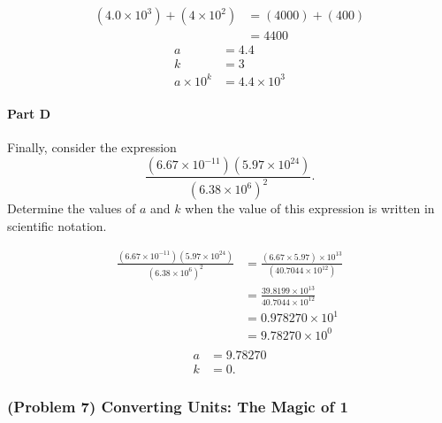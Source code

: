 \vspace{1em}

\begin{solution}
	\begin{align*}
		\left( 4.0 \times 10^{3} \right) + \left( 4 \times 10^2 \right) &=
		\left( 4000 \right) + \left( 400 \right) \\
		&= 4400
	\end{align*}
	\begin{align*}
		a &= 4.4 \\
		k &= 3 \\
		a \times 10^{k} &= 4.4 \times 10^{3}
	\end{align*}
\end{solution}

\paragraph{Part D}

Finally, consider the expression
\[
	\frac{\left( 6.67 \times 10^{-11} \right)\left( 5.97 \times 10^{24} \right)}{\left( 6.38 \times 10^{6} \right)^2}
	.\]
Determine the values of $a$ and $k$ when the value of this expression is written in scientific notation.

\vspace{1em}

\begin{solution}
	\begin{align*}
		\frac{\left( 6.67 \times 10^{-11} \right)\left( 5.97 \times 10^{24} \right)}{\left( 6.38 \times 10^{6} \right)^2} &=
		\frac{\left( 6.67 \times 5.97 \right) \times 10^{13}}{\left( 40.7044 \times 10^{12} \right)} \\
		&= \frac{39.8199 \times 10^{13}}{40.7044 \times 10^{12}} \\
		&= 0.978270 \times 10^{1} \\
		&= 9.78270 \times 10^{0} \\
	\end{align*}
	\begin{align*}
		a &= 9.78270 \\
		k &= 0
		.\end{align*}
\end{solution}

\newpage

\subsubsection{(Problem 7) Converting Units: The Magic of 1}

